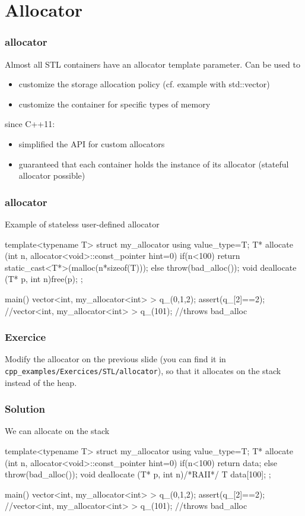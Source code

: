 \documentclass[aspectratio=43]{beamer}
\begin{document}
\section{Allocator}

\begin{frame}[fragile]\frametitle{allocator}
  Almost all STL containers have an allocator template parameter.
  Can be used to
  \begin{itemize}
    \item customize the storage allocation policy (cf. example with std::vector)
    \item customize the container for specific types of memory
  \end{itemize}
  since C++11:
  \begin{itemize}
  \item simplified the API for custom allocators
  \item guaranteed that each container holds the instance of its allocator (\alert{stateful allocator possible})
  \end{itemize}
\end{frame}


\begin{frame}[fragile]\frametitle{allocator}
  Example of stateless user-defined allocator
  \begin{Cpplisting}{}
template<typename T>
struct my_allocator{
  using value_type=T;
  T* allocate (int n, allocator<void>::const_pointer hint=0){
    if(n<100)
      return static_cast<T*>(malloc(n*sizeof(T)));
    else throw(bad_alloc());
  }
  void deallocate (T* p, int n){free(p);}
};

main(){
  vector<int,  my_allocator<int> > q_({0,1,2});
  assert(q_[2]==2);
  //vector<int,  my_allocator<int> > q_(101); //throws bad_alloc
}
  \end{Cpplisting}
\end{frame}

\begin{frame}[fragile]\frametitle{Exercice}
  Modify the allocator on the previous slide
  (you can find it in \verb~cpp_examples/Exercices/STL/allocator~), so that it allocates on the
  stack instead of the heap.

\end{frame}


\begin{frame}[fragile]\frametitle{Solution}
  We can allocate on the stack
  \begin{Cpplisting}{}
template<typename T>
struct my_allocator{
  using value_type=T;
  T* allocate (int n, allocator<void>::const_pointer hint=0){
    if(n<100)
      return data; else throw(bad_alloc());
  }
  void deallocate (T* p, int n){/*RAII*/}
  T data[100];
};

main(){
  vector<int,  my_allocator<int> > q_({0,1,2});
  assert(q_[2]==2);
  //vector<int,  my_allocator<int> > q_(101); //throws bad_alloc
}
  \end{Cpplisting}
\end{frame}
\end{document}
